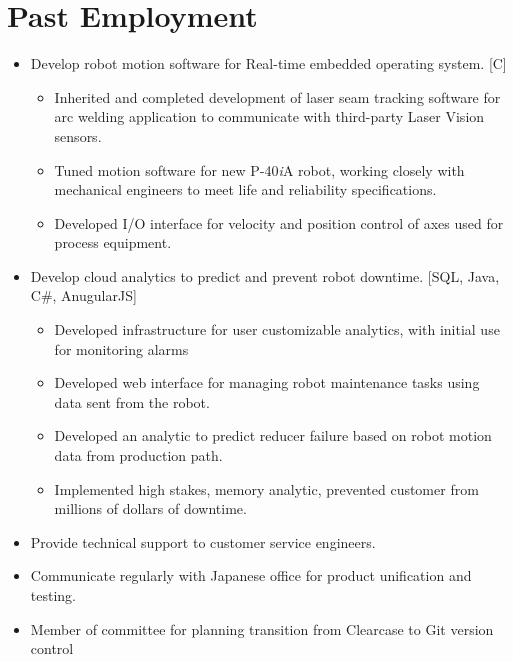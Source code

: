 \documentclass{BradyResume}
\begin{document}
\section*{Past Employment}
\begin{itemize}
  \item Develop robot motion software for Real-time embedded operating system. [C]
  \begin{itemize}
  	  \item Inherited and completed development of  laser seam tracking software for arc welding application to communicate with third-party Laser Vision sensors.
	  \item Tuned motion software for new P-40{\it{i}}A robot, working closely with mechanical engineers to meet life and reliability specifications.
	  \item Developed I/O interface for velocity and position control of axes used for process equipment.
  \end{itemize}
  \item Develop cloud analytics to predict and prevent robot downtime. [SQL, Java, C\#, AnugularJS]
  \begin{itemize}
    \item Developed infrastructure for user customizable analytics, with initial use for monitoring alarms
    \item Developed web interface for managing robot maintenance tasks using data sent from the robot.
    \item Developed an analytic to predict reducer failure based on  robot motion data from production path.
    \item Implemented high stakes, memory analytic, prevented customer from millions of dollars of downtime.
  \end{itemize}
  \item Provide technical support to customer service engineers.
  
  \item Communicate regularly with Japanese office for product unification and testing.
  \item Member of committee for planning transition from Clearcase to Git version control

\end{itemize}
\end{document}
